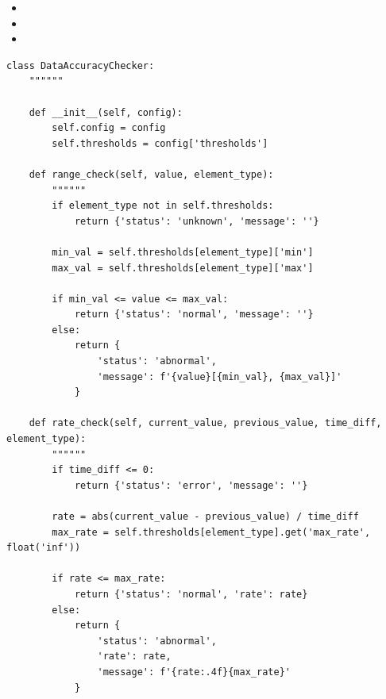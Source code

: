 \begin{itemize}
\item
  \important{}
\item
  \important{}
\item
  \important{}
\end{itemize}

\begin{lstlisting}[style=python]
class DataAccuracyChecker:
    """"""
    
    def __init__(self, config):
        self.config = config
        self.thresholds = config['thresholds']
    
    def range_check(self, value, element_type):
        """"""
        if element_type not in self.thresholds:
            return {'status': 'unknown', 'message': ''}
        
        min_val = self.thresholds[element_type]['min']
        max_val = self.thresholds[element_type]['max']
        
        if min_val <= value <= max_val:
            return {'status': 'normal', 'message': ''}
        else:
            return {
                'status': 'abnormal', 
                'message': f'{value}[{min_val}, {max_val}]'
            }
    
    def rate_check(self, current_value, previous_value, time_diff, element_type):
        """"""
        if time_diff <= 0:
            return {'status': 'error', 'message': ''}
        
        rate = abs(current_value - previous_value) / time_diff
        max_rate = self.thresholds[element_type].get('max_rate', float('inf'))
        
        if rate <= max_rate:
            return {'status': 'normal', 'rate': rate}
        else:
            return {
                'status': 'abnormal',
                'rate': rate,
                'message': f'{rate:.4f}{max_rate}'
            }
\end{lstlisting}

\hypertarget{section-35}{%
\subsubsection{}\label{section-35}}

\hypertarget{section-36}{%
\paragraph{}\label{section-36}}

